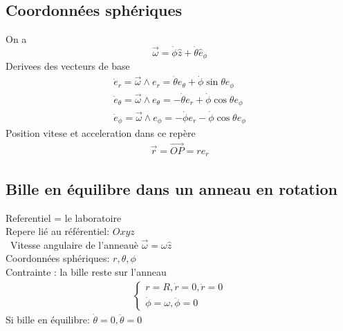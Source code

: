 \documentclass[../main.tex]{subfiles}
\begin{document}
\subsection{Coordonnées sphériques}
On a 
\[ 
	\vec{\omega} = \dot{\phi} \hat{z} + \dot{\theta}\hat{e}_{\phi} 
\]
Derivees des vecteurs de base
\begin{align*}
	\dot{e}_{r} = \vec{\omega} \land e_r = \dot{\theta} e_{\theta}  + \dot{\phi} \sin \theta e_{\phi} \\
	\dot{e}_{\theta} = \vec{\omega} \land e_{\theta}  = -\dot{\theta} e_{r}  + \dot{\phi} \cos \theta e_{\phi} \\
	\dot{e}_{\phi} = \vec{\omega} \land e_{\phi}  = -\dot{\phi} e_{r}  - \dot{\phi} \cos \theta e_{\phi} 
\end{align*}
Position vitese et acceleration dans ce repère
\begin{align*}
\vec{r} = \vec{OP} = r e_{r} 
\end{align*}
\subsection{Bille en équilibre dans un anneau en rotation}
Referentiel = le laboratoire\\
Repere lié au référentiel: $Oxyz$ \\\
Vitesse angulaire de l'anneauè $ \vec{\omega} = \omega \hat{z}$ \\
Coordonnées sphériques: $r,\theta,\phi$ \\
Contrainte : la bille reste sur l'anneau
\begin{align*}
\begin{cases}
	r= R, \dot{r} =0, \ddot{r}=0\\
	\dot{\phi} = \omega, \ddot{\phi}=0
\end{cases}
\end{align*}
Si bille en équilibre: $\dot \theta =0, \ddot \theta=0$
\end{document}
